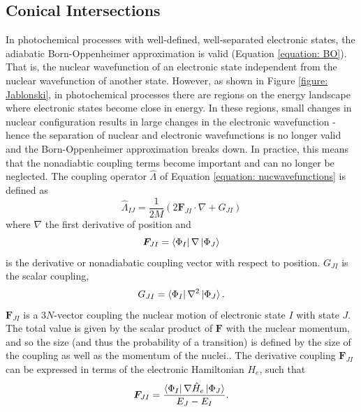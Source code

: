 \subsection{Conical Intersections} \label{section: photo_conicals}
In photochemical processes with well-defined, well-separated electronic states, the adiabatic Born-Oppenheimer approximation is valid (Equation \ref{equation: BO}). That is, the nuclear wavefunction of an electronic state independent from the nuclear wavefunction of another state. However, as shown in Figure \ref{figure: Jablonski}, in photochemical processes there are regions on the energy landscape where electronic states become close in energy. In these regions, small changes in nuclear configuration results in large changes in the electronic wavefunction - hence the separation of nuclear and electronic wavefunctions is no longer valid and the Born-Oppenheimer approximation breaks down.\cite{Domcke2011} In practice, this means that the nonadiabtic coupling terms become important and can no longer be neglected. The coupling operator $\hat{\Lambda}$ of Equation \ref{equation: nucwavefunctions} is defined as\cite{Worth2004}
\begin{equation}
    \hat{\Lambda}_{IJ}=\frac{1}{2M}(2\bm{F}_{JI}\cdot{}\nabla{}+G_{JI})
\end{equation}
where $\nabla$ the first derivative of position and
\begin{equation}
    \bm{F}_{JI}=\bra{\Phi_{I}}\nabla{}\ket{\Phi_{J}}
\end{equation}
is the derivative or nonadiabatic coupling vector with respect to position. $G_{JI}$ is the scalar coupling,
\begin{equation}
    G_{JI}=\bra{\Phi_{I}}\nabla{}^{2}\ket{\Phi_{J}}.
\end{equation}
$\bm{F}_{JI}$ is a 3$N$-vector coupling the nuclear motion of electronic state $I$ with state $J$. The total value is given by the scalar product of $\bm{F}$ with the nuclear momentum, and so the size (and thus the probability of a transition) is defined by the size of the coupling as well as the momentum of the nuclei.\cite{Worth2004}. The derivative coupling $\bm{F}_{JI}$ can be expressed in terms of the electronic Hamiltonian $H_{e}$, such that
\begin{equation}\label{equation: NAC_F}
        \bm{F}_{JI}=\frac{\bra{\Phi_{I}}\nabla{}\hat{H}_{e}\ket{\Phi_{J}}}{E_{J}-E_{I}}.
\end{equation}

